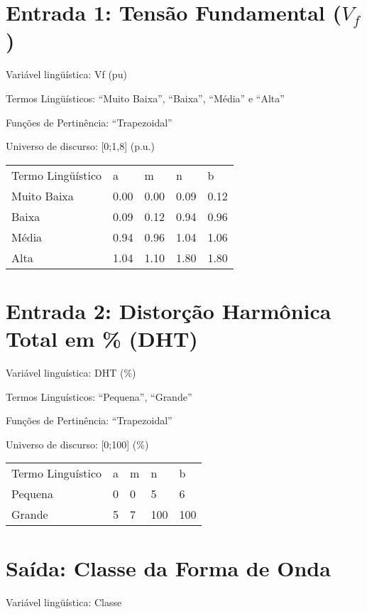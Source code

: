 \documentclass{report}
\begin{document}
\section{Entrada 1: Tensão Fundamental ($V_f$)}

Variável lingüística: Vf (pu)

Termos Lingüísticos: “Muito Baixa”, “Baixa”, “Média” e “Alta”

Funções de Pertinência: “Trapezoidal”

Universo de discurso: [0;1,8] (p.u.)


\begin{center}
\begin{tabular}{lllll}
Termo Lingüístico & a & m & n & b\\
Muito Baixa & 0.00 & 0.00 & 0.09 & 0.12\\
Baixa & 0.09 & 0.12 & 0.94 & 0.96\\
Média & 0.94 & 0.96 & 1.04 & 1.06\\
Alta & 1.04 & 1.10 & 1.80 & 1.80\\
\end{tabular}
\end{center}



\section{Entrada 2: Distorção Harmônica Total em \% (DHT)}

 Variável linguística: DHT (\%)

 Termos Linguísticos: “Pequena”, “Grande”

 Funções de Pertinência: “Trapezoidal”

 Universo de discurso: [0;100] (\%)


\begin{center}
\begin{tabular}{lllll}
Termo Linguístico & a & m & n & b\\
Pequena & 0 & 0 & 5 & 6\\
Grande & 5 & 7 & 100 & 100
\end{tabular}
\end{center}



\section{Saída: Classe da Forma de Onda}

Variável lingüística: Classe
\end{document}
